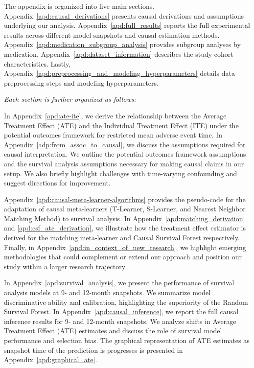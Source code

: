 The appendix is organized into five main sections.
Appendix~\ref{apd:causal_derivations} presents causal derivations and assumptions underlying our analysis. Appendix~\ref{apd:full_results} reports the full experimental results across different model snapshots and causal estimation methods. Appendix~\ref{apd:medication_subgroup_analysis} provides subgroup analyses by medication. Appendix~\ref{apd:dataset_information} describes the study cohort characteristics. Lastly, Appendix~\ref{apd:preprocessing_and_modeling_hyperparameters} details data preprocessing steps and modeling hyperparameters.

\noindent\emph{Each section is further organized as follows:}

In Appendix~\ref{apd:ate-ite}, we derive the relationship between the Average Treatment Effect (ATE) and the Individual Treatment Effect (ITE) under the potential outcomes framework for restricted mean adverse event time.
In Appendix~\ref{adp:from_assoc_to_causal}, we discuss the assumptions required for causal interpretation.
We outline the potential outcomes framework assumptions and the survival analysis assumptions necessary for making causal claims in our setup.
We also briefly highlight challenges with time-varying confounding and suggest directions for improvement.  

Appendix~\ref{apd:causal-meta-learner-algorithms} provides the pseudo-code for the adaptation of causal meta-learners (T-Learner, S-Learner, and Nearest Neighbor Matching Method) to survival analysis.
In Appendix~\ref{apd:matching_derivation} and \ref{apd:csf_ate_derivation}, we illustrate how the treatment effect estimator is derived for the matching meta-learner and Causal Survival Forest respectively. 
Finally, in Appendix~\ref{apd:in_context_of_new_research}, we highlight emerging methodologies that could complement or extend our approach and position our study within a larger research trajectory 

In Appendix~\ref{apd:survival_analysis}, we present the performance of survival analysis models at 9- and 12-month snapshots.  
We summarize model discriminative ability and calibration, highlighting the superiority of the Random Survival Forest.  
In Appendix~\ref{apd:causal_inference}, we report the full causal inference results for 9- and 12-month snapshots.  
We analyze shifts in Average Treatment Effect (ATE) estimates and discuss the role of survival model performance and selection bias. 
The graphical representation of ATE estimates as snapshot time of the prediction is progresses is presented in Appendix~\ref{apd:graphical_ate}.

